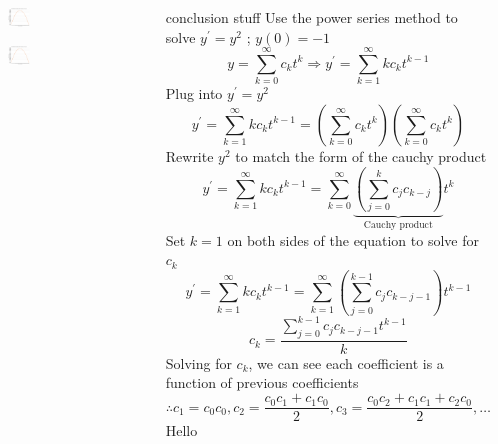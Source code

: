 \documentclass[25pt, a0paper, portrait]{tikzposter}
\begin{document}
\begin{columns}
    {
        \blindtext
    } 
    \begin{subcolumns}
    {
        \begin{tikzfigure}
        \includegraphics[width=0.16\textwidth]{images/PSM5 TS1 Plot.png}
        \end{tikzfigure}
    }
    {
        \begin{tikzfigure}
        \includegraphics[width=0.16\textwidth]{images/PSM5 TS1 Plot.png}
        \end{tikzfigure}
    }
    \end{subcolumns}
    {
        conclusion stuff
    }
    {
        Use the power series method to solve $y^\prime = y^2$ ; $y(0) = -1$
        \begin{equation*}
            y = \sum\limits_{k=0}^{\infty}c_kt^k \Rightarrow y^\prime = \sum\limits_{k=1}^{\infty}kc_kt^{k-1}
        \end{equation*}
        Plug into $y^\prime = y^2$
        \begin{equation*}
            y^\prime = \sum\limits_{k=1}^{\infty}kc_kt^{k-1} = \left(\sum\limits_{k=0}^{\infty}c_kt^k\right) \left(\sum\limits_{k=0}^{\infty}c_kt^k\right)
        \end{equation*}
        Rewrite $y^2$ to match the form of the cauchy product
        \begin{equation}
            y^\prime = \sum\limits_{k=1}^{\infty}kc_kt^{k-1} = \sum\limits_{k=0}^{\infty} \underbrace{\left(\sum\limits_{j=0}^{k}c_jc_{k-j}\right)}_{\text{Cauchy product}}t^k
        \end{equation}
        Set $k = 1$ on both sides of the equation to solve for $c_k$
        \begin{equation*}
            y^\prime = \sum\limits_{k=1}^{\infty}kc_kt^{k-1} = \sum\limits_{k=1}^{\infty} \left(\sum\limits_{j=0}^{k-1}c_jc_{k-j-1}\right)t^{k-1}
        \end{equation*}
        \begin{equation}
            c_k = \frac{\sum\limits_{j=0}^{k-1}c_jc_{k-j-1}t^{k-1}}{k}
        \end{equation}
        Solving for $c_k$, we can see each coefficient is a function of previous coefficients
        \begin{equation*}
            \therefore c_1 = c_0c_0, c_2 = \frac{c_0c_1 + c_1c_0}{2}, c_3 = \frac{c_0c_2 + c_1c_1+ c_2c_0}{2},\dots
        \end{equation*}
    }
    {
        Hello
    }
\end{columns}
\end{document}

